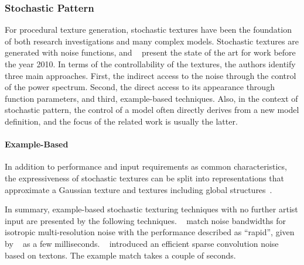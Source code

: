 \subsubsection{Stochastic Pattern}
\label{subsubsec:analysis_distribution_and_repetition_stochastic}

For procedural texture generation, stochastic textures have been the foundation of both research investigations and many complex models. Stochastic textures are generated with noise functions, and \citeauthor*{lagae_2010_sap}~\cite{lagae_2010_sap} present the state of the art for work before the year 2010. In terms of the controllability of the textures, the authors identify three main approaches. First, the indirect access to the noise through the control of the power spectrum. Second, the direct access to its appearance through function parameters, and 
third, example-based techniques. Also, in the context of stochastic pattern, the control of a model often directly derives from a new model definition, and the focus of the related work is usually the latter.


\paragraph*{Example-Based}
\label{para:analysis_stochastic_examplebased_control}



In addition to performance and input requirements as common characteristics, the expressiveness of stochastic textures can be split into representations that approximate a Gaussian texture and textures including global structures~\cite{galerne_2017_tno,lagae_2010_sap}.

In summary, example-based stochastic texturing techniques with no further artist input are presented by the following techniques. \citeauthor*{lagae_2010_pis}~\cite{lagae_2010_pis} match noise bandwidths for isotropic multi-resolution noise with the performance described as ``rapid'', given by \citeauthor*{gilet_2012_mkn}~\cite{gilet_2012_mkn} as a few milliseconds. \citeauthor*{galerne_2017_tno}~\cite{galerne_2017_tno} introduced an efficient sparse convolution noise based on textons. The example match takes a couple of seconds.

